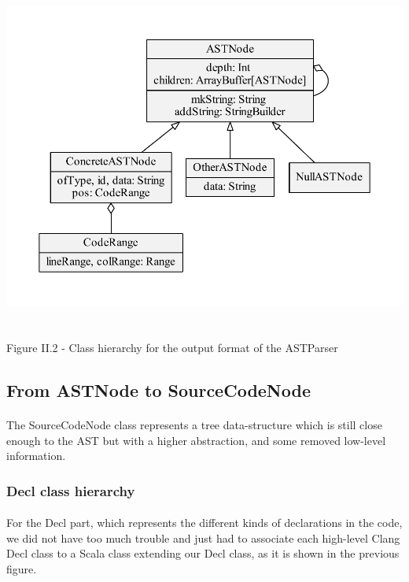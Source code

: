 \documentclass{report}
\begin{document}
\begin{center}
\includegraphics[scale=0.6]{data/AST_classes}
~\\~\\Figure II.2 - Class hierarchy for the output format of the ASTParser
\end{center}

\subsection{From ASTNode to SourceCodeNode}

\paragraph{}
\hspace{4mm}The SourceCodeNode class represents a tree data-structure which is still close enough to the AST 
but with a higher abstraction, and some removed low-level information.

\subsubsection{Decl class hierarchy}

\paragraph{}
\hspace{4mm}For the Decl part,  which represents the different kinds of declarations in the code, we did not have too much trouble and just had to associate each high-level Clang Decl class to a Scala class extending
our Decl class, as it is shown in the previous figure.
\end{document}
